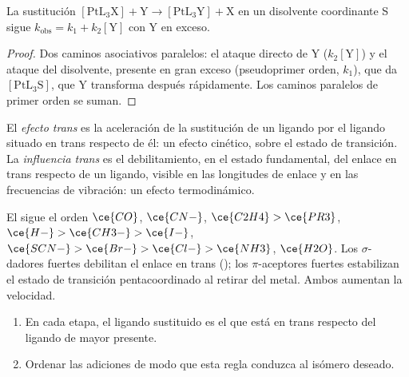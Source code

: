 \begin{proposition}\label{prop:b3:complex-mechanisms:square-planar}
La sustitución $\mathrm{[PtL_3X] + Y \to [PtL_3Y] + X}$ en un disolvente coordinante S sigue
$k_{\mathrm{obs}} = k_1 + k_2[\mathrm Y]$ con Y en exceso.
\end{proposition}

\begin{proof}
Dos caminos asociativos paralelos: el ataque directo de Y ($k_2[\mathrm Y]$) y el ataque del
disolvente, presente en gran exceso (pseudoprimer orden, $k_1$), que da $[\mathrm{PtL_3S}]$, que
Y transforma después rápidamente. Los caminos paralelos de primer orden se suman.
\end{proof}

\begin{definition}\label{def:b3:complex-mechanisms:trans-effect}
El \emph{efecto trans} es la aceleración de la sustitución
de un ligando por el ligando situado en trans respecto de él: un efecto cinético, sobre el estado de transición.
La \emph{influencia trans} es el debilitamiento, en el estado
fundamental, del enlace en trans respecto de un ligando, visible en las longitudes de enlace y en las frecuencias
de vibración: un efecto termodinámico.
\end{definition}

El  sigue el orden $\ce{CO}$, $\ce{CN-}$, $\ce{C2H4} > \ce{PR3}$, $\ce{H-} > \ce{CH3-} > \ce{I-}$, $\ce{SCN-} >
\ce{Br-} > \ce{Cl-} > \ce{NH3}$, $\ce{H2O}$. Los $\sigma$-dadores fuertes debilitan el enlace en trans ();
los $\pi$-aceptores fuertes estabilizan el estado de transición pentacoordinado al retirar
 del metal. Ambos aumentan la velocidad.

\begin{method}\label{met:b3:complex-mechanisms:pt-synthesis}
\begin{enumerate}
  \item En cada etapa, el ligando sustituido es el que está en trans respecto del ligando de
        mayor  presente.
  \item Ordenar las adiciones de modo que esta regla conduzca al isómero deseado.
\end{enumerate}
\end{method}

